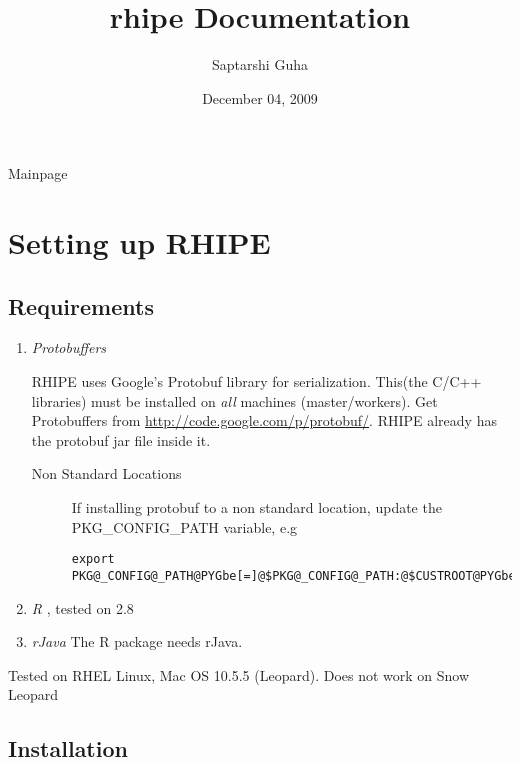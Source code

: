\documentclass[letterpaper,10pt,english]{manual}
\title{rhipe Documentation}
\date{December 04, 2009}
\author{Saptarshi Guha}
\begin{document}
\maketitle
\tableofcontents



Mainpage

\resetcurrentobjects
\hypertarget{--doc-installation}{}

\chapter{Setting up RHIPE}


\section{Requirements}
\begin{enumerate}
\item {} 
\emph{Protobuffers}

RHIPE uses Google's Protobuf library for serialization. This(the C/C++
libraries) must be installed on \emph{all} machines (master/workers). Get
Protobuffers from \href{http://code.google.com/p/protobuf/}{http://code.google.com/p/protobuf/}. RHIPE already has the
protobuf jar file inside it.
\begin{description}
\item[Non Standard Locations]
If installing protobuf to a non standard location, update the
PKG\_CONFIG\_PATH variable, e.g

\begin{Verbatim}[commandchars=@\[\]]
export PKG@_CONFIG@_PATH@PYGbe[=]@$PKG@_CONFIG@_PATH:@$CUSTROOT@PYGbe[/]lib@PYGbe[/]pkgconfig@PYGbe[/]
\end{Verbatim}

\end{description}

\item {} 
\emph{R} , tested on 2.8

\item {} 
\emph{rJava} The R package needs rJava.

\end{enumerate}

Tested on RHEL Linux, Mac OS 10.5.5 (Leopard).
Does not work on Snow Leopard


\section{Installation}
\end{document}
